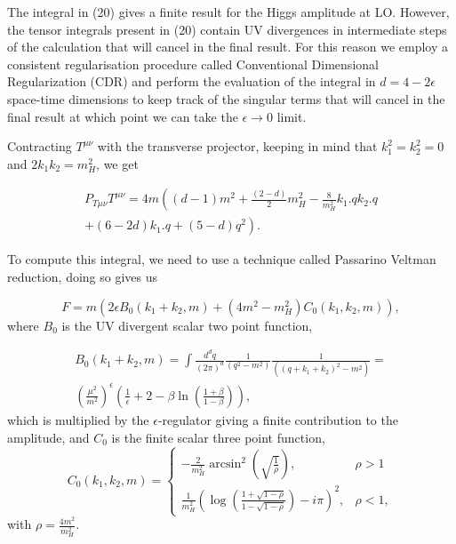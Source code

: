 \documentclass[EPJ,twocolumn]{webofc}
\begin{document}
The integral in (20) gives a finite result for the Higgs amplitude at LO. However, the tensor integrals present in (20) contain UV divergences in intermediate steps of the calculation that will cancel in the final result. For this reason we employ a consistent regularisation procedure called Conventional Dimensional Regularization (CDR) and perform the evaluation of the integral in $d=4-2\epsilon$ space-time dimensions to keep track of the singular terms that will cancel in the final result at which point we can take the $\epsilon \rightarrow 0$ limit.  

Contracting $T^{\mu\nu}$ with the transverse projector, keeping in mind that $k_1^2=k_2^2=0$ and $2k_1k_2 = m_H^2$, we get


\small

\begin{multline}
     P_{T\mu\nu}T^{\mu\nu} = 4m\left((d-1)m^2+\frac{(2-d)}{2}m_H^2-\frac{8}{m_H^2}k_1.q k_2.q\right. \\\left. +(6-2d)k_1.q+(5-d)q^2 \right) .
\end{multline}
   

\normalsize

To compute this integral, we need to use a technique called Passarino Veltman reduction, doing so gives us

\begin{equation}
    F=m\left(2\epsilon B_0(k_1+k_2,m)+(4m^2-m_H^2)C_0(k_1,k_2,m) \right),
\end{equation}
where $B_0$ is the UV divergent scalar two point function, 

\begin{multline}
    B_0(k_1+k_2,m) = \int \frac{d^dq}{(2\pi)^d} \frac{1}{(q^2-m^2)} \frac{1}{((q+k_1+k_2)^2-m^2)} = \\ (\frac{\mu^2}{m^2})^{\epsilon}(\frac{1}{\epsilon} + 2 - \beta \ln (\frac{1+\beta}{1-\beta})),
\end{multline}
which is multiplied by the $\epsilon$-regulator giving a finite contribution to the amplitude, and $C_0$ is the finite scalar three point function, 
\begin{equation}
    C_0(k_1,k_2,m) = \begin{cases}
            -\frac{2}{m_H^2}\arcsin^2{\left(\sqrt{\frac{1}{\rho}} \right)}  ,& \rho > 1  \\
             \frac{1}{m_H^2}\left(\log\left( \frac{1+\sqrt{1-\rho}}{1-\sqrt{1-\rho}}\right)-i\pi \right)^2,& \rho < 1,
            \end{cases}
\end{equation}
with $\rho = \frac{4m^2}{m_H^2}$. 
\end{document}
